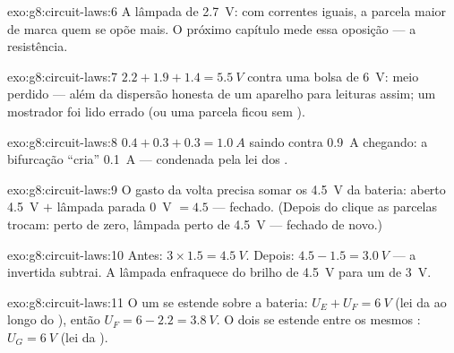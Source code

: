 \begin{solution}{exo:g8:circuit-laws:6}
A lâmpada de \qty{2.7}{V}: com correntes iguais, a parcela maior de
 marca quem se opõe mais. O próximo capítulo mede essa oposição
--- a resistência.
\end{solution}

\begin{solution}{exo:g8:circuit-laws:7}
$2.2 + 1.9 + 1.4 = \qty{5.5}{V}$ contra uma bolsa de \qty{6}{V}: meio
 perdido --- além da dispersão honesta de um aparelho para
leituras assim; um mostrador foi lido errado (ou uma parcela ficou
sem ).
\end{solution}

\begin{solution}{exo:g8:circuit-laws:8}
$0.4 + 0.3 + 0.3 = \qty{1.0}{A}$ saindo contra \qty{0.9}{A} chegando:
a bifurcação ``cria'' \qty{0.1}{A} --- condenada pela lei dos .
\end{solution}

\begin{solution}{exo:g8:circuit-laws:9}
O gasto da volta precisa somar os \qty{4.5}{V} da bateria:
 aberto \qty{4.5}{V} $+$ lâmpada parada \qty{0}{V} $= 4.5$
--- fechado. (Depois do clique as parcelas trocam:  perto
de zero, lâmpada perto de \qty{4.5}{V} --- fechado de novo.)
\end{solution}

\begin{solution}{exo:g8:circuit-laws:10}
Antes: $3 \times 1.5 = \qty{4.5}{V}$. Depois:
$4.5 - 1.5 = \qty{3.0}{V}$ --- a  invertida subtrai. A lâmpada
enfraquece do brilho de \qty{4.5}{V} para um de \qty{3}{V}.
\end{solution}

\begin{solution}{exo:g8:circuit-laws:11}
O  um se estende sobre a bateria: $U_E + U_F = \qty{6}{V}$ (lei
da   ao longo do ), então
$U_F = 6 - 2.2 = \qty{3.8}{V}$. O  dois se estende entre os
mesmos : $U_G = \qty{6}{V}$ (lei da  ).
\end{solution}

